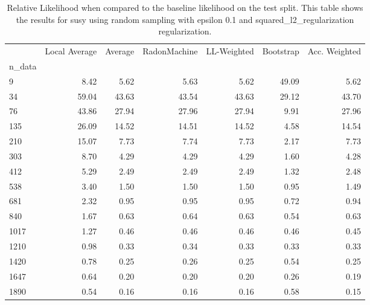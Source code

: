 \begin{table}
\centering
\caption{Relative Likelihood when compared to the baseline likelihood on the test split. This table shows the results for  susy using  random sampling with epsilon  0.1 and  squared_l2_regularization regularization.}
\label{tab:10}
\begin{tabular}{lrrrrrr}
\toprule
{} &  Local Average &  Average &  RadonMachine &  LL-Weighted &  Bootstrap &  Acc. Weighted \\
n\_data &                &          &               &              &            &                \\
\midrule
9      &           8.42 &     5.62 &          5.63 &         5.62 &      49.09 &           5.62 \\
34     &          59.04 &    43.63 &         43.54 &        43.63 &      29.12 &          43.70 \\
76     &          43.86 &    27.94 &         27.96 &        27.94 &       9.91 &          27.96 \\
135    &          26.09 &    14.52 &         14.51 &        14.52 &       4.58 &          14.54 \\
210    &          15.07 &     7.73 &          7.74 &         7.73 &       2.17 &           7.73 \\
303    &           8.70 &     4.29 &          4.29 &         4.29 &       1.60 &           4.28 \\
412    &           5.29 &     2.49 &          2.49 &         2.49 &       1.32 &           2.48 \\
538    &           3.40 &     1.50 &          1.50 &         1.50 &       0.95 &           1.49 \\
681    &           2.32 &     0.95 &          0.95 &         0.95 &       0.72 &           0.94 \\
840    &           1.67 &     0.63 &          0.64 &         0.63 &       0.54 &           0.63 \\
1017   &           1.27 &     0.46 &          0.46 &         0.46 &       0.46 &           0.45 \\
1210   &           0.98 &     0.33 &          0.34 &         0.33 &       0.33 &           0.33 \\
1420   &           0.78 &     0.25 &          0.26 &         0.25 &       0.54 &           0.25 \\
1647   &           0.64 &     0.20 &          0.20 &         0.20 &       0.26 &           0.19 \\
1890   &           0.54 &     0.16 &          0.16 &         0.16 &       0.58 &           0.15 \\
\bottomrule
\end{tabular}
\end{table}
